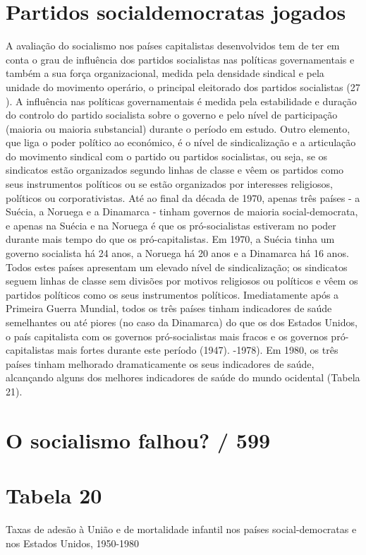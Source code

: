 {{{\section{Partidos socialdemocratas jogados}
 \par 
A avaliação do socialismo nos países capitalistas desenvolvidos tem de ter em conta o grau de influência dos partidos socialistas nas políticas governamentais e também a sua força organizacional, medida pela densidade sindical e pela unidade do movimento operário, o principal eleitorado dos partidos socialistas (27 ). A influência nas políticas governamentais é medida pela estabilidade e duração do controlo do partido socialista sobre o governo e pelo nível de participação (maioria ou maioria substancial) durante o período em estudo. Outro elemento, que liga o poder político ao económico, é o nível de sindicalização e a articulação do movimento sindical com o partido ou partidos socialistas, ou seja, se os sindicatos estão organizados segundo linhas de classe e vêem os partidos como seus instrumentos políticos ou se estão organizados por interesses religiosos, políticos ou corporativistas. Até ao final da década de 1970, apenas três países - a Suécia, a Noruega e a Dinamarca - tinham governos de maioria social-democrata, e apenas na Suécia e na Noruega é que os pró-socialistas estiveram no poder durante mais tempo do que os pró-capitalistas. Em 1970, a Suécia tinha um governo socialista há {\color{blue}24} anos, a Noruega há {\color{blue}20} anos e a Dinamarca há {\color{blue}16} anos. Todos estes países apresentam um elevado nível de sindicalização; os sindicatos seguem linhas de classe sem divisões por motivos religiosos ou políticos e vêem os partidos políticos como os seus instrumentos políticos. Imediatamente após a Primeira Guerra Mundial, todos os três países tinham indicadores de saúde semelhantes ou até piores (no caso da Dinamarca) do que os dos Estados Unidos, o país capitalista com os governos pró-socialistas mais fracos e os governos pró-capitalistas mais fortes durante este período (1947). -1978). Em 1980, os três países tinham melhorado dramaticamente os seus indicadores de saúde, alcançando alguns dos melhores indicadores de saúde do mundo ocidental (Tabela {\color{blue}21}).
 \par 
\section{O socialismo falhou? / 599}
 \par 
\section{Tabela 20}
 \par 
Taxas de adesão à União e de mortalidade infantil nos países social-democratas e nos Estados Unidos, 1950-1980
 \par 
}}}
